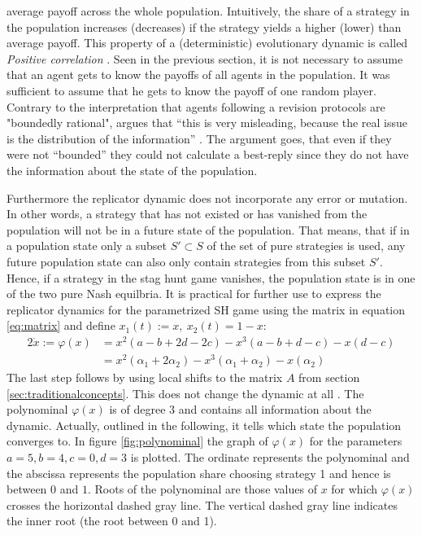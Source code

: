 average payoff across the whole population.
Intuitively, the share of a strategy in the population increases (decreases) 
if the strategy yields a higher (lower) than average payoff. 
This property of a (deterministic) evolutionary dynamic is called 
\textit{Positive correlation} \parencite[144]{sandholm_population_2010}. 
Seen in the previous section, it is not necessary to assume that an agent
gets to know the payoffs of all agents in the population. 
It was sufficient to assume that he gets to know the payoff of one random 
player. 
Contrary to the interpretation that agents following a revision protocols 
are "boundedly rational", \textcite{gintis_game_2000}  argues 
that ``this is very misleading, because the real issue is the 
distribution of the information'' \parencite[273]{gintis_game_2000}. 
The argument goes, that even if they were not ``bounded'' they 
could not calculate a best-reply since they do not have the information about
the state of the population.

Furthermore the replicator dynamic does not incorporate any error or mutation.
In other words, a strategy that has not existed or has vanished from the 
population will not be in a future state of the population. 
That means, that if in a population state only a subset $S' \subset S$ of the 
set of pure strategies is used, any future population state can also only 
contain strategies from this subset $S'$. Hence, if a strategy in 
the stag hunt game vanishes, the population state is in one of the two pure 
Nash equilbria. It is practical for further use to express the replicator 
dynamics for the parametrized SH game using the matrix in equation 
\eqref{eq:matrix} and define $x_1(t) := x,\ x_2(t) = 1-x$:
\begin{alignat}{2}
        \label{eq:replicatorpara}
        \dot{x} := \varphi(x) &= x^2(a-b+2d-2c) - x^3(a-b+d-c) -x(d-c) \\
                              &= x^2(\alpha_1+2\alpha_2) 
        - x^3(\alpha_1+\alpha_2) - x(\alpha_2)
\end{alignat}
The last step follows by using local shifts to the matrix $A$ from section
\ref{sec:traditionalconcepts}. This does not change the dynamic at all 
\parencite[73]{weibull_evolutionary_1997}. The polynominal $\varphi(x)$ is
of degree $3$ and contains all information about the dynamic. Actually, 
outlined in the following, it tells which state the population converges to.
In figure \ref{fig:polynominal} the graph of $\varphi(x)$ for the parameters
$a=5, b=4,c=0,d=3$ is plotted. The ordinate represents the polynominal and
the abscissa represents the population share choosing strategy 1 and hence is
between $0$ and $1$. Roots of the polynominal are those values of $x$ for 
which $\varphi(x)$ crosses the horizontal dashed gray line. The vertical
dashed gray line indicates the inner root (the root between 0 and 1).

